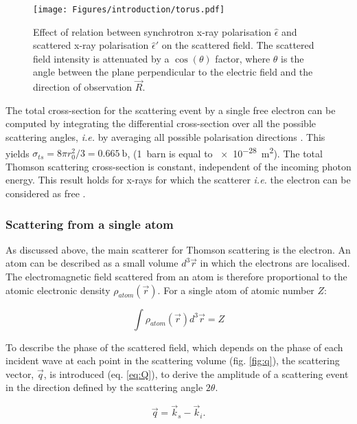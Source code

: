 \begin{figure}[!htb]
    \centering
    \texttt{[image: Figures/introduction/torus.pdf]}
    \caption{
        Effect of relation between synchrotron x-ray polarisation $\hat{\epsilon}$ and scattered x-ray polarisation $\hat{\epsilon}'$ on the scattered field.
        The scattered field intensity is attenuated by a $\cos{(\theta)}$ factor, where $\theta$ is the angle between the plane perpendicular to the electric field and the direction of observation $\vec{R}$.
    }
    \label{fig:PolarisationEffect}
\end{figure}

The total cross-section for the scattering event by a single free electron can be computed by integrating the differential cross-section over all the possible scattering angles, \textit{i.e.} by averaging all possible polarisation directions \parencite{Willmott}.
This yields $\sigma_{ts} = 8 \pi r_0^2 /3 = \qty{0.665}{\barn}$, (\qty{1}{barn} is equal to \qty{e-28}{\m^2}).
The total Thomson scattering cross-section is constant, independent of the incoming photon energy.
This result holds for x-rays for which the scatterer \textit{i.e.} the electron can be considered as free \parencite{Willmott}.

\subsubsection{Scattering from a single atom}\label{sec:scattering}

As discussed above, the main scatterer for Thomson scattering is the electron.
An atom can be described as a small volume $d^3\vec{r}$ in which the electrons are localised.
The electromagnetic field scattered from an atom is therefore proportional to the atomic electronic density $\rho_{atom}(\vec{r})$.
For a single atom of atomic number $Z$:

\begin{equation}
    \int \rho_{atom} (\vec{r}) d^3\vec{r} = Z
\end{equation}

To describe the phase of the scattered field, which depends on the phase of each incident wave at each point in the scattering volume (fig. \ref{fig:q}), the scattering vector, $\vec{q}$, is introduced (eq. \ref{eq:Q}), to derive the amplitude of a scattering event in the direction defined by the scattering angle $2\theta$.

\begin{equation}
    \label{eq:Q}
    \vec{q}=\vec{k}_s-\vec{k}_i.
\end{equation}

